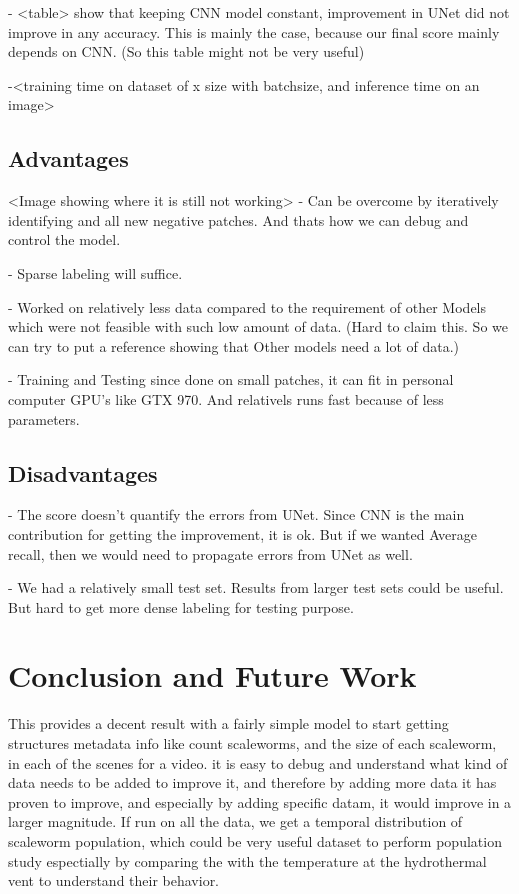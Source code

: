 \documentclass[10pt,twocolumn,letterpaper]{article}
\begin{document}
- <table> show that keeping CNN model constant, improvement in UNet did not improve in any accuracy. This is mainly the case, because our final score mainly depends on CNN. (So this table might not be very useful)

-<training time on dataset of x size with batchsize, and inference time on an image>

\subsection{Advantages}
<Image showing where it is still not working>
- Can be overcome by iteratively identifying and all new negative patches. And thats how we can debug and control the model.

- Sparse labeling will suffice.

- Worked on relatively less data compared to the requirement of other Models which were not feasible with such low amount of data. (Hard to claim this. So we can try to put a reference showing that Other models need a lot of data.)

- Training and Testing since done on small patches, it can fit in personal computer GPU's like GTX 970. And relativels runs fast because of less parameters.

\subsection{Disadvantages}
- The score doesn't quantify the errors from UNet. Since CNN is the main contribution for getting the improvement, it is ok. But if we wanted Average recall, then we would need to propagate errors from UNet as well.

- We had a relatively small test set. Results from larger test sets could be useful. But hard to get more dense labeling for testing purpose.

\section{Conclusion and Future Work}

This provides a decent result with a fairly simple model to start getting structures metadata info like count scaleworms, and the size of each scaleworm, in each of the scenes for a video. it is easy to debug and understand what kind of data needs to be added to improve it, and therefore by adding more data it has proven to improve, and especially by adding specific datam, it would improve in a larger magnitude. If run on all the data, we get a temporal distribution of scaleworm population, which could be very useful dataset to perform population study espectially by comparing the with the temperature at the hydrothermal vent to understand their behavior.
\end{document}
